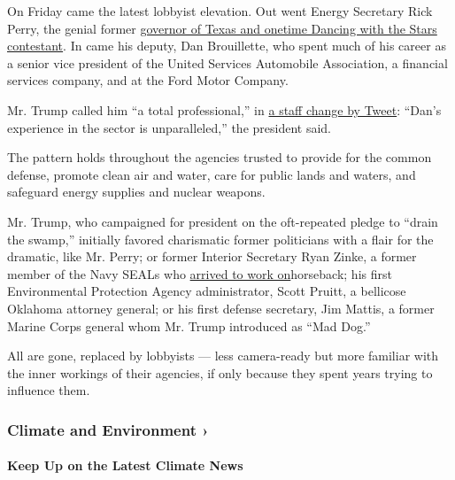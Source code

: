 On Friday came the latest lobbyist elevation. Out went Energy Secretary
Rick Perry, the genial former
\href{https://www.nytimes.com/2016/12/13/us/politics/rick-perry-energy-secretary-trump.html}{governor
of Texas and onetime Dancing with the Stars contestant}. In came his
deputy, Dan Brouillette, who spent much of his career as a senior vice
president of the United Services Automobile Association, a financial
services company, and at the Ford Motor Company.

Mr. Trump called him ``a total professional,'' in
\href{https://twitter.com/realDonaldTrump/status/1185277957436248065?s=20}{a
staff change by Tweet}: ``Dan's experience in the sector is
unparalleled,'' the president said.

The pattern holds throughout the agencies trusted to provide for the
common defense, promote clean air and water, care for public lands and
waters, and safeguard energy supplies and nuclear weapons.

Mr. Trump, who campaigned for president on the oft-repeated pledge to
``drain the swamp,'' initially favored charismatic former politicians
with a flair for the dramatic, like Mr. Perry; or former Interior
Secretary Ryan Zinke, a former member of the Navy SEALs who
\href{https://www.nytimes.com/2017/03/02/us/politics/secretary-ryan-zinke-horse-interior.html}{arrived
to work on}horseback; his first Environmental Protection Agency
administrator, Scott Pruitt, a bellicose Oklahoma attorney general; or
his first defense secretary, Jim Mattis, a former Marine Corps general
whom Mr. Trump introduced as ``Mad Dog.''

All are gone, replaced by lobbyists --- less camera-ready but more
familiar with the inner workings of their agencies, if only because they
spent years trying to influence them.

\href{https://www.nytimes.com/section/climate?action=click\&pgtype=Article\&state=default\&region=MAIN_CONTENT_1\&context=storylines_keepup}{}

\hypertarget{climate-and-environment-}{%
\subsubsection{Climate and Environment
›}\label{climate-and-environment-}}

\hypertarget{keep-up-on-the-latest-climate-news}{%
\paragraph{Keep Up on the Latest Climate
News}\label{keep-up-on-the-latest-climate-news}}

